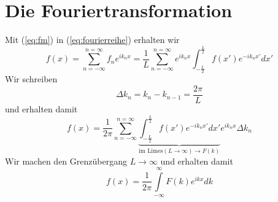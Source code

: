 \section{Die Fouriertransformation}
Mit (\ref{eq:fm}) in (\ref{eq:fourierreihe}) erhalten wir
\begin{equation}
f(x)=\sum_{n=-\infty}^{n=\infty}f_n e^{ik_n x}=\frac{1}{L}\sum_{n=-\infty}^{n=\infty}
e^{ik_nx}\int_{-\frac{L}{2}}^{\frac{L}{2}}f(x') e^{-ik_nx'}dx'
\end{equation}
Wir schreiben
\[
\Delta k_n=k_n-k_{n-1}=\frac{2\pi}{L}
\]
und erhalten damit
\[
f(x)=\frac{1}{2\pi}\sum_{n=-\infty}^{n=\infty}
\underbrace{\int_{-\frac{L}{2}}^{\frac{L}{2}}f(x') e^{-ik_nx'}dx'}_{\mbox{im Limes} (L\rightarrow\infty)\rightarrow F(k)}
e^{ik_nx}\Delta k_n
\]
Wir machen den Grenzübergang $L\rightarrow\infty$ und erhalten damit
\[
f(x)=\frac{1}{2\pi}\int\limits_{-\infty}^{\infty}F(k) e^{ikx}dk
\]

